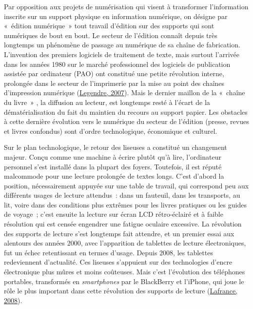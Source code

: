 \documentclass[12pt,french,letterpaper,]{article}
\begin{document}
Par opposition aux projets de numérisation qui visent à transformer
l'information inscrite sur un support physique en information numérique,
on désigne par «~édition numérique~» tout travail d'édition sur des
supports qui sont numériques de bout en bout. Le secteur de l'édition
connaît depuis très longtemps un phénomène de passage au numérique de sa
chaîne de fabrication. L'invention des premiers logiciels de traitement
de texte, mais surtout l'arrivée dans les années 1980 sur le marché
professionnel des logiciels de publication assistée par ordinateur (PAO)
ont constitué une petite révolution interne, prolongée dans le secteur
de l'imprimerie par la mise au point des chaînes d'impression numérique
(\protect\hyperlink{ref-legendre_les_2007}{Legendre, 2007}). Mais le
dernier maillon de la «~chaîne du livre~» , la diffusion au lecteur, est
longtemps resté à l'écart de la dématérialisation du fait du maintien du
recours au support papier. Les obstacles à cette dernière évolution vers
le numérique du secteur de l'édition (presse, revues et livres
confondus) sont d'ordre technologique, économique et culturel.

Sur le plan technologique, le retour des liseuses a constitué un
changement majeur. Conçu comme une machine à écrire plutôt qu'à lire,
l'ordinateur personnel s'est installé dans la plupart des foyers.
Toutefois, il est réputé malcommode pour une lecture prolongée de textes
longs. C'est d'abord la position, nécessairement appuyée sur une table
de travail, qui correspond peu aux différents usages de lecture
attendus~: dans un fauteuil, dans les transports, au lit, voire dans des
conditions plus extrêmes pour les livres pratiques ou les guides de
voyage~; c'est ensuite la lecture sur écran LCD rétro-éclairé et à
faible résolution qui est censée engendrer une fatigue oculaire
excessive. La révolution des supports de lecture s'est longtemps fait
attendre, et un premier essai aux alentours des années 2000, avec
l'apparition de tablettes de lecture électroniques, fut un échec
retentissant en termes d'usage. Depuis 2008, les tablettes redeviennent
d'actualité. Ces liseuses s'appuient sur des technologies d'encre
électronique plus mûres et moins coûteuses. Mais c'est l'évolution des
téléphones portables, transformés en \emph{smartphones} par le
BlackBerry et l'iPhone, qui joue le rôle le plus important dans cette
révolution des supports de lecture
(\protect\hyperlink{ref-lafrance_bataille_2008}{Lafrance, 2008}).
\end{document}
